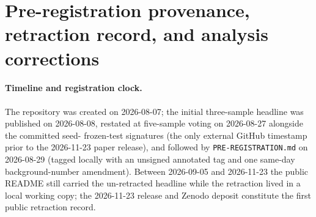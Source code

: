 \documentclass[11pt]{article}
\begin{document}
{\small

}

\appendix

\section{Pre-registration provenance, retraction record, and analysis corrections}
\label{app:provenance}

\paragraph{Timeline and registration clock.} The repository was created on 2026-08-07; the initial three-sample headline was published on 2026-08-08, restated at five-sample voting on 2026-08-27 alongside the committed seed-\frozenSeed{} frozen-test signatures (the only external GitHub timestamp prior to the 2026-11-23 paper release), and followed by \texttt{PRE-REGISTRATION.md} on 2026-08-29 (tagged locally with an unsigned annotated tag and one same-day background-number amendment). Between 2026-09-05 and 2026-11-23 the public README still carried the un-retracted headline while the retraction lived in a local working copy; the 2026-11-23 release and Zenodo deposit constitute the first public retraction record.
\end{document}

